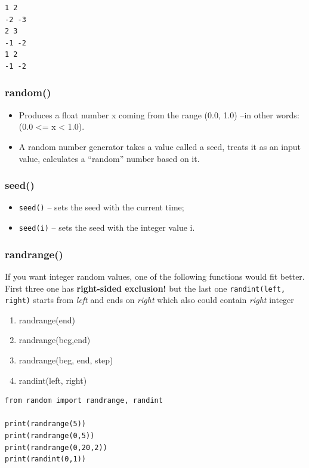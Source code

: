 \documentclass[11pt]{article}
\begin{document}
\begin{verbatim}
1 2
-2 -3
2 3
-1 -2
1 2
-1 -2
\end{verbatim}

\subsubsection{random()}
\label{sec:org98dcda9}
\begin{itemize}
\item Produces a float number x coming from the range (0.0, 1.0) –in other
words: (0.0 <= x < 1.0).
\item A random number generator takes a value called a seed, treats it as
an input value, calculates a “random” number based on it.
\end{itemize}
\subsubsection{seed()}
\label{sec:org18e3845}
\begin{itemize}
\item \texttt{seed()} – sets the seed with the current time;
\item \texttt{seed(i)} – sets the seed with the integer value i.
\end{itemize}
\subsubsection{randrange()}
\label{sec:orgaf9068a}
If you want integer random values, one of the following functions
would fit better. First three one has \textbf{right-sided exclusion!} but the
last one \texttt{randint(left, right)} starts from \emph{left} and ends on \emph{right}
which also could contain \emph{right} integer

\begin{enumerate}
\item randrange(end)
\item randrange(beg,end)
\item randrange(beg, end, step)
\item randint(left, right)
\end{enumerate}


\begin{verbatim}
from random import randrange, randint

print(randrange(5))
print(randrange(0,5))
print(randrange(0,20,2))
print(randint(0,1))
\end{verbatim}
\end{document}
